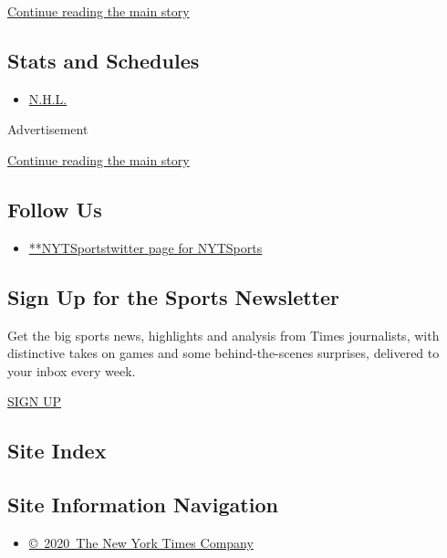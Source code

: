 \protect\hyperlink{after-mid1}{Continue reading the main story}

\hypertarget{stats-and-schedules}{%
\subsection{Stats and Schedules}\label{stats-and-schedules}}

\begin{itemize}
\tightlist
\item
  \protect\hyperlink{}{N.H.L.}
\end{itemize}

Advertisement

\protect\hyperlink{after-mktg}{Continue reading the main story}

\hypertarget{follow-us}{%
\subsection{Follow Us}\label{follow-us}}

\begin{itemize}
\tightlist
\item
  \href{https://twitter.com/NYTSports}{**NYTSportstwitter page for
  NYTSports}
\end{itemize}

\hypertarget{sign-up-for-the-sports-newsletter}{%
\subsection{Sign Up for the Sports
Newsletter}\label{sign-up-for-the-sports-newsletter}}

Get the big sports news, highlights and analysis from Times journalists,
with distinctive takes on games and some behind-the-scenes surprises,
delivered to your inbox every week.

\href{/newsletters/signup/SP}{SIGN UP}

\hypertarget{site-index}{%
\subsection{Site Index}\label{site-index}}

\hypertarget{site-information-navigation}{%
\subsection{Site Information
Navigation}\label{site-information-navigation}}

\begin{itemize}
\tightlist
\item
  \href{https://help.nytimes3xbfgragh.onion/hc/en-us/articles/115014792127-Copyright-notice}{©~2020~The
  New York Times Company}
\end{itemize}

